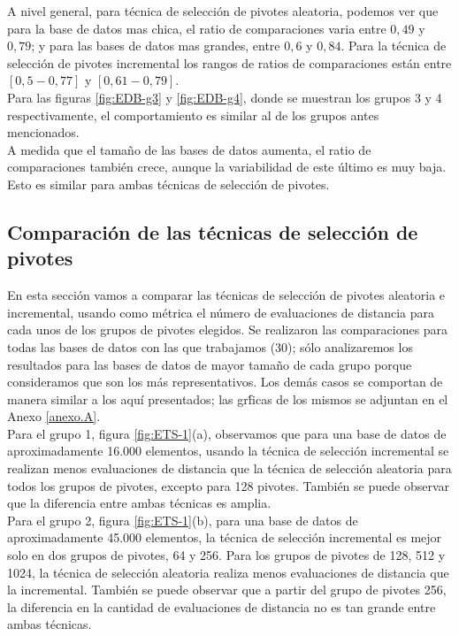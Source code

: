 A nivel general, para t\'ecnica de selecci\'on de pivotes aleatoria, podemos ver que para la base de datos mas chica, el ratio de comparaciones varia entre $0,49$ y $0,79$; y para las bases de datos mas grandes, entre $0,6$ y $0,84$. Para la t\'ecnica de selecci\'on de pivotes incremental los rangos de ratios de comparaciones est\'an entre $[0,5 - 0,77]$ y $[0,61 - 0,79]$. \\

Para las figuras \ref{fig:EDB-g3} y \ref{fig:EDB-g4}, donde se muestran los grupos 3 y 4 respectivamente, el comportamiento es similar al de los grupos antes mencionados.\\

A medida que el tama\~no de las bases de datos aumenta, el ratio de comparaciones tambi\'en crece, aunque la variabilidad de este \'ultimo es muy baja. Esto es similar para ambas t\'ecnicas de selecci\'on de pivotes.

\subsection{Comparaci\'on de las t\'ecnicas de selecci\'on de pivotes}

En esta secci\'on vamos a comparar las t\'ecnicas de selecci\'on de pivotes aleatoria e incremental, usando como m\'etrica el n\'umero de evaluaciones de distancia para cada unos de los grupos de pivotes elegidos. Se realizaron las comparaciones para todas las bases de datos con las que trabajamos (30); s\'olo analizaremos los resultados para las bases de datos de mayor tama\~no de cada grupo porque consideramos que son los m\'as representativos. Los dem\'as casos se comportan de manera similar a los aqu\'i presentados; las gr\'ficas de los mismos se adjuntan en el Anexo \ref{anexo.A}.\\

Para el grupo 1, figura \ref{fig:ETS-1}(a), observamos que para una base de datos de aproximadamente 16.000 elementos, usando la t\'ecnica de selecci\'on incremental se realizan menos evaluaciones de distancia que la t\'ecnica de selecci\'on aleatoria para todos los grupos de pivotes, excepto para 128 pivotes. Tambi\'en se puede observar que la diferencia entre ambas t\'ecnicas es amplia.\\

Para el grupo 2, figura \ref{fig:ETS-1}(b), para una base de datos de aproximadamente 45.000 elementos, la t\'ecnica de selecci\'on incremental es mejor solo en dos grupos de pivotes, 64 y 256. Para los grupos de pivotes de 128, 512 y 1024, la t\'ecnica de selecci\'on aleatoria realiza menos evaluaciones de distancia que la incremental. Tambi\'en se puede observar que a partir del grupo de pivotes 256, la diferencia en la cantidad de evaluaciones de distancia no es tan grande entre ambas t\'ecnicas.\\

